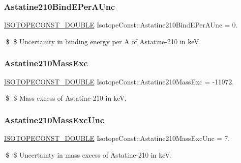 \subsubsection{\texorpdfstring{Astatine210\+Bind\+E\+Per\+A\+Unc}{Astatine210BindEPerAUnc}}
{\footnotesize\ttfamily \mbox{\hyperlink{group___isotope_const-_macros_ga8f45a7272ce02c0b4c65c44636ed719a}{I\+S\+O\+T\+O\+P\+E\+C\+O\+N\+S\+T\+\_\+\+D\+O\+U\+B\+LE}} Isotope\+Const\+::\+Astatine210\+Bind\+E\+Per\+A\+Unc = 0.}

\$ \$ Uncertainty in binding energy per A of Astatine-\/210 in keV. \mbox{\label{group___isotope_const-_astatine-_at210_ga8fba0420bb2e3b52dcc9d4155acdd638}} 
\subsubsection{\texorpdfstring{Astatine210\+Mass\+Exc}{Astatine210MassExc}}
{\footnotesize\ttfamily \mbox{\hyperlink{group___isotope_const-_macros_ga8f45a7272ce02c0b4c65c44636ed719a}{I\+S\+O\+T\+O\+P\+E\+C\+O\+N\+S\+T\+\_\+\+D\+O\+U\+B\+LE}} Isotope\+Const\+::\+Astatine210\+Mass\+Exc = -\/11972.}

\$ \$ Mass excess of Astatine-\/210 in keV. \mbox{\label{group___isotope_const-_astatine-_at210_gaea16e25fa0a943b8cd760bc15913f602}} 
\subsubsection{\texorpdfstring{Astatine210\+Mass\+Exc\+Unc}{Astatine210MassExcUnc}}
{\footnotesize\ttfamily \mbox{\hyperlink{group___isotope_const-_macros_ga8f45a7272ce02c0b4c65c44636ed719a}{I\+S\+O\+T\+O\+P\+E\+C\+O\+N\+S\+T\+\_\+\+D\+O\+U\+B\+LE}} Isotope\+Const\+::\+Astatine210\+Mass\+Exc\+Unc = 7.}

\$ \$ Uncertainty in mass excess of Astatine-\/210 in keV. \mbox{\label{group___isotope_const-_astatine-_at210_ga199fbae4b0b9eae5a8fe66e4e1939beb}} 
